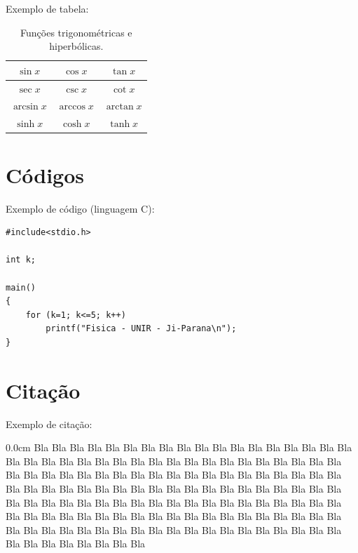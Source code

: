 \documentclass[a4paper,reqno,12pt,oneside]{book}
\begin{document}
Exemplo de tabela:

\begin{table}[H]
\begin{center}
	\begin{tabular}{|c|c|c|}
		\hline
		$\sin{x}$ & $\cos{x}$ & $\tan{x}$ \\
		\hline
		$\sec{x}$ & $\csc{x}$ & $\cot{x}$ \\
		\hline
		$\arcsin{x}$ & $\arccos{x}$ & $\arctan{x}$ \\
		\hline
		$\sinh{x}$ & $\cosh{x}$ & $\tanh{x}$ \\
		\hline
	\end{tabular}
	\vspace{0.3cm}
	\caption{Funções trigonométricas e hiperbólicas.}
	\label{funcoes}
\end{center}
\end{table}


\section{Códigos}

Exemplo de código (linguagem C):

\vspace{0.5cm}
\begin{lstlisting}
#include<stdio.h>

int k;

main()
{
	for (k=1; k<=5; k++)
		printf("Fisica - UNIR - Ji-Parana\n");
}
\end{lstlisting}

\section{Citação}

Exemplo de citação:

\vspace{0.5cm}
\begin{addmargin}[3cm]{0.0cm}\small{
		Bla Bla Bla Bla Bla Bla Bla Bla Bla Bla Bla Bla Bla Bla Bla Bla Bla Bla Bla Bla
		Bla Bla Bla Bla Bla Bla Bla Bla Bla Bla Bla Bla Bla Bla Bla Bla Bla Bla Bla Bla
		Bla Bla Bla Bla Bla Bla Bla Bla Bla Bla Bla Bla Bla Bla Bla Bla Bla Bla Bla Bla
		Bla Bla Bla Bla Bla Bla Bla Bla Bla Bla Bla Bla Bla Bla Bla Bla Bla Bla Bla Bla
		Bla Bla Bla Bla Bla Bla Bla Bla Bla Bla Bla Bla Bla Bla Bla Bla Bla Bla Bla Bla
		Bla Bla Bla Bla Bla Bla Bla Bla Bla Bla Bla Bla Bla Bla Bla Bla Bla Bla Bla Bla
		Bla Bla Bla Bla Bla Bla Bla Bla Bla Bla Bla Bla Bla Bla Bla Bla Bla Bla Bla Bla
}\end{addmargin}
\vspace{0.5cm}
\end{document}
